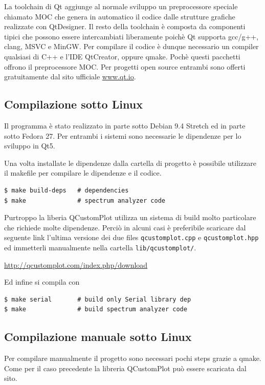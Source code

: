 La toolchain di Qt aggiunge al normale sviluppo un preprocessore speciale
chiamato MOC che genera in automatico il codice dalle strutture grafiche
realizzate con QtDesigner. Il resto della toolchain \`e composta da componenti
tipici che possono essere intercambiati liberamente poich\`e Qt supporta
gcc/g++, clang, MSVC e MinGW. Per compilare il codice \`e dunque necessario un
compiler qualsiasi di C++ e l'IDE QtCreator, oppure qmake. Poch\`e questi
pacchetti offrono il preprocessore MOC. Per progetti open source entrambi sono
offerti gratuitamente dal sito ufficiale \url{www.qt.io}.

\subsection{Compilazione sotto Linux}
Il programma \`e stato realizzato in parte sotto Debian 9.4 Stretch ed in
parte sotto Fedora 27. Per entrambi i sistemi sono necessarie le dipendenze
per lo sviluppo in Qt5.

\noindent Una volta installate le dipendenze dalla cartella di progetto \`e
possibile utilizzare il makefile per compilare le dipendenze e il codice.
\begin{Verbatim}[frame=single]
$ make build-deps   # dependencies
$ make              # spectrum analyzer code 
\end{Verbatim}
Purtroppo la liberia QCustomPlot utilizza un sistema di build molto
particolare che richiede molte dipendenze. Perci\`o in alcuni casi \`e
preferibile scaricare dal seguente link l'ultima versione dei due files
\texttt{qcustomplot.cpp} e \texttt{qcustomplot.hpp} ed immetterli manualmente
nella cartella \texttt{lib/qcustomplot/}.
\begin{center}
\url{http://qcustomplot.com/index.php/download}
\end{center}
Ed infine si compila con
\begin{Verbatim}[frame=single]
$ make serial       # build only Serial library dep
$ make              # build spectrum analyzer code 
\end{Verbatim}

\subsection{Compilazione manuale sotto Linux}
Per compilare manualmente il progetto sono necessari pochi steps grazie a
qmake. Come per il caso precedente la libreria QCustomPlot pu\`o essere
scaricata dal sito.

